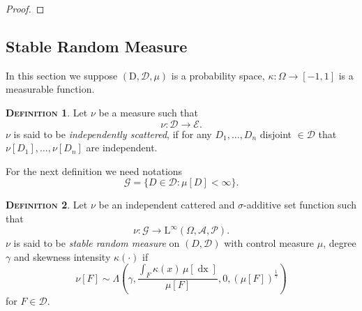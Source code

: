 \documentclass[a4paper, twoside, 11pt]{article}
\theoremstyle{definition}
\newtheorem{definition}{\scshape Definition}[section]
\newcommand{\brkt}[1]{\left({#1} \right)}
\begin{document}
\begin{proof}
  
\end{proof}


\subsection{Stable Random Measure}
In this section we suppose $(\mathrm{D}, \mathscr{D}, \mu)$ is a probability space, $\kappa : \Omega \rightarrow [-1, 1]$ is a measurable function.
\begin{definition}
	Let $\nu$ be a measure such that
	\begin{equation}
	  \nu : \mathscr{D} \rightarrow \mathscr{E}.\nonumber
	\end{equation}
	$\nu$ is said to be \emph{independently scattered}, if for any $D_1,\dots, D_n$ disjoint $\in \mathscr{D}$ that $\nu[D_1], \dots, \nu[D_n]$ are independent.
\end{definition}

For the next definition we need notations
\begin{equation}
  \mathscr{G} = \{D \in \mathscr{D} : \mu[D] < \infty \}.
\end{equation}
\begin{definition}
  Let $\nu$ be an independent cattered and $\sigma$-additive set function such that
\begin{equation*}
  \nu: \mathscr{G}  \rightarrow \mathrm{L}^{\infty}(\Omega, \mathscr{A}, \mathcal{P}). 
\end{equation*}
$\nu$ is said to be \emph{stable random measure} on $(D, \mathscr{D})$ with control measure $\mu$, degree $\gamma$ and skewness intensity $\kappa(\cdot)$ if 
\begin{equation}
  \nu[F] \sim \Lambda\brkt{\gamma, \frac{\int_F \kappa(x)\, \mu[\mathop{dx}]}{\mu[F]}, 0, (\mu[F])^{\frac{1}{\gamma}}}
\end{equation}
for $F \in \mathscr{D}$.
\end{definition}
\end{document}
